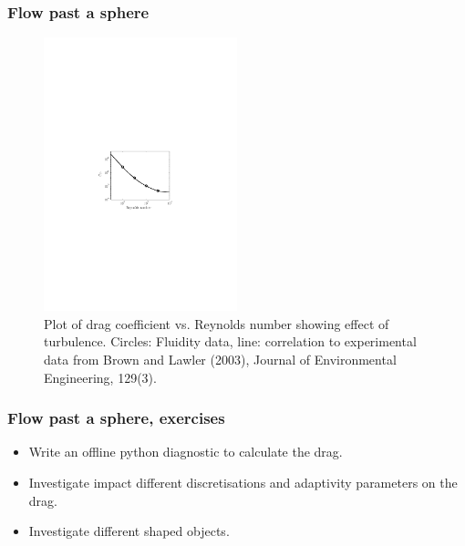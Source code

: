 \begin{frame}
    \frametitle{Flow past a sphere}
\begin{figure}
\centering
\includegraphics[width=0.5\textwidth]{./flow_past_sphere/Sphere_Drag.pdf}
\caption{Plot of drag coefficient vs. Reynolds number showing effect of turbulence. Circles: Fluidity data, line: correlation to experimental data from Brown and Lawler (2003), Journal of Environmental Engineering, 129(3).}
\end{figure}
\end{frame}

\begin{frame}
\frametitle{Flow past a sphere, exercises}
\begin{itemize}
\item Write an offline python diagnostic to calculate the drag.
\item Investigate impact different discretisations and adaptivity parameters on the drag.
\item Investigate different shaped objects.
\end{itemize}
\end{frame}
